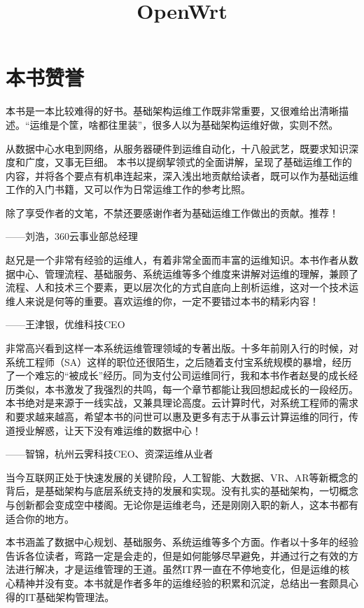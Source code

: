\documentclass[12pt,UTF8]{ctexbook}
\title{\heiti\zihao{0} OpenWrt}
\author{}
\date{}
\begin{document}
\maketitle
\tableofcontents

\frontmatter

\chapter{本书赞誉}

本书是一本比较难得的好书。基础架构运维工作既非常重要，又很难给出清晰描述。“运维是个筐，啥都往里装”，很多人以为基础架构运维好做，实则不然。

从数据中心水电到网络，从服务器硬件到运维自动化，十八般武艺，既要求知识深度和广度，又事无巨细。
本书以提纲挈领式的全面讲解，呈现了基础运维工作的内容，并将各个要点有机串连起来，深入浅出地贡献给读者，既可以作为基础运维工作的入门书籍，又可以作为日常运维工作的参考比照。

除了享受作者的文笔，不禁还要感谢作者为基础运维工作做出的贡献。推荐！

——刘浩，360云事业部总经理

赵兄是一个非常有经验的运维人，有着非常全面而丰富的运维知识。本书作者从数据中心、管理流程、基础服务、系统运维等多个维度来讲解对运维的理解，兼顾了流程、人和技术三个要素，更以层次化的方式自底向上剖析运维，这对一个技术运维人来说是何等的重要。喜欢运维的你，一定不要错过本书的精彩内容！

——王津银，优维科技CEO

非常高兴看到这样一本系统运维管理领域的专著出版。十多年前刚入行的时候，对系统工程师（SA）这样的职位还很陌生，之后随着支付宝系统规模的暴增，经历了一个难忘的“被成长”经历。同为支付公司运维同行，我和本书作者赵旻的成长经历类似，本书激发了我强烈的共鸣，每一个章节都能让我回想起成长的一段经历。本书绝对是来源于一线实战，又兼具理论高度。云计算时代，对系统工程师的需求和要求越来越高，希望本书的问世可以惠及更多有志于从事云计算运维的同行，传道授业解惑，让天下没有难运维的数据中心！

——智锦，杭州云霁科技CEO、资深运维从业者

当今互联网正处于快速发展的关键阶段，人工智能、大数据、VR、AR等新概念的背后，是基础架构与底层系统支持的发展和实现。没有扎实的基础架构，一切概念与创新都会变成空中楼阁。无论你是运维老鸟，还是刚刚入职的新人，这本书都有适合你的地方。

本书涵盖了数据中心规划、基础服务、系统运维等多个方面。作者以十多年的经验告诉各位读者，弯路一定是会走的，但是如何能够尽早避免，并通过行之有效的方法进行解决，才是运维管理的王道。虽然IT界一直在不停地变化，但是运维的核心精神并没有变。本书就是作者多年的运维经验的积累和沉淀，总结出一套颇具心得的IT基础架构管理法。
\end{document}
